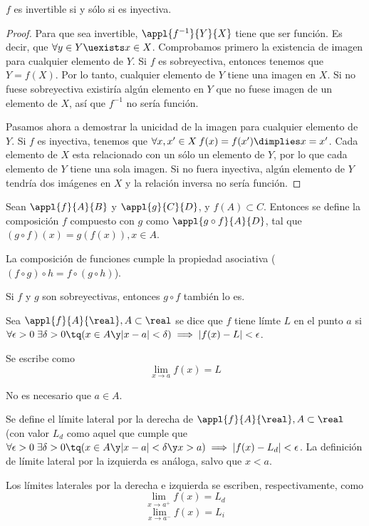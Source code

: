 \documentclass[palatino, nochap]{apuntes}
\begin{document}
\begin{prop} $f$ es invertible si y sólo si es inyectiva.

\begin{proof}
Para que \stdf sea invertible, $\appl{f^{-1}}{Y}{X}$ tiene que ser función. Es decir, que $\forall y\in Y \uexists x \in X$. Comprobamos primero la existencia de imagen para cualquier elemento de $Y$. Si $f$ es sobreyectiva, entonces tenemos que $Y=f(X)$. Por lo tanto, cualquier elemento de $Y$ tiene una imagen en $X$. Si no fuese sobreyectiva existiría algún elemento en $Y$ que no fuese imagen de un elemento de $X$, así que $f^{-1}$ no sería función.

Pasamos ahora a demostrar la unicidad de la imagen para cualquier elemento de $Y$. Si $f$ es inyectiva, tenemos que $\forall x,x' \in X \: f(x)=f(x') \dimplies x=x'$. Cada elemento de $X$ esta relacionado con un sólo un elemento de $Y$, por lo que cada elemento de $Y$ tiene una sola imagen. Si no fuera inyectiva, algún elemento de $Y$ tendría dos imágenes en $X$ y la relación inversa no sería función.
\end{proof}
\end{prop}

\begin{defn} Sean $\appl{f}{A}{B}$ y $\appl{g}{C}{D}$, y $f(A)\subset C$. Entonces se define la composición $f$ compuesto con $g$ como $\appl{g\circ f}{A}{D}$, tal que $(g \circ f)(x)=g(f(x)), x \in A$.

La composición de funciones cumple la propiedad asociativa ($(f\circ g)\circ h=f\circ (g\circ h)$).

Si $f$ y $g$ son sobreyectivas, entonces $g\circ f$ también lo es.
\end{defn}

\begin{defn}[Límite] Sea $\appl{f}{A}{\real}, A\subset\real$ se dice que $f$ tiene límte $L$ en el punto $a$ si $\forall \epsilon > 0 \; \exists \delta >0 \tq (x\in A \y |x-a|<\delta) \implies |f(x)-L|<\epsilon$.

Se escribe como \[\lim_{x\to a}f(x)=L\]
\end{defn}

\begin{remark}
No es necesario que $a\in A$.\end{remark}

\begin{defn} Se define el límite lateral por la derecha de $\appl{f}{A}{\real}, A\subset\real$ (con valor $L_d$ como aquel que cumple que $\forall  \epsilon >0 \;\exists\delta >0 \tq( x\in A \y |x-a| <\delta \y x>a) \implies |f(x)-L_d|<\epsilon$. La definición de límite lateral por la izquierda es análoga, salvo que $x<a$.

Los límites laterales por la derecha e izquierda se escriben, respectivamente, como
\[ \lim_{x\to a^{+}}f(x)=L_d\]
\[ \lim_{x\to a^{-}}f(x)=L_i\]
\end{defn}
\end{document}
